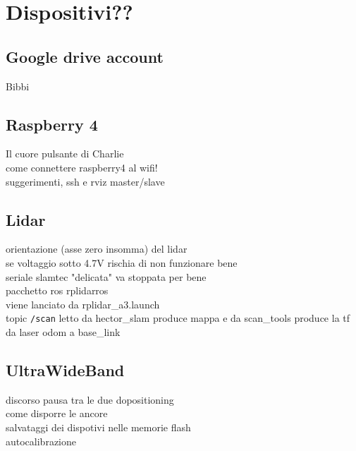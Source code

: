 
\graphicspath{{./figs/}}


	


\newpage\null\thispagestyle{empty}\newpage
\newpage
{}
\setcounter{page}{1}
\tableofcontents

\newpage





\section{Dispositivi??}

\subsection{Google drive account}
Bibbi

\subsection{Raspberry 4}
Il cuore pulsante di Charlie\\
come connettere raspberry4 al wifi!\\
suggerimenti, ssh e rviz master/slave \\
\subsection{Lidar}
orientazione (asse zero insomma) del lidar \\
se voltaggio sotto 4.7V rischia di non funzionare bene\\
seriale slamtec "delicata" va stoppata per bene\\
pacchetto ros rplidarros\\
viene lanciato da rplidar\_a3.launch \\
topic \texttt{/scan} letto da hector\_slam produce mappa e da scan\_tools produce la tf da laser odom a base\_link \\

\subsection{UltraWideBand}
discorso pausa tra le due dopositioning\\
come disporre le ancore \\
salvataggi dei dispotivi nelle memorie flash \\
autocalibrazione \\


